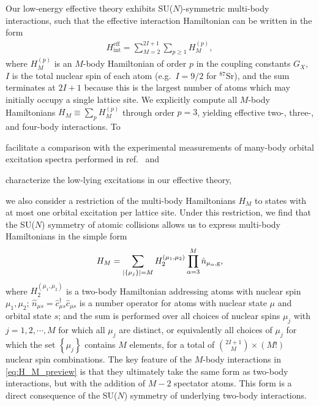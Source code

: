 \documentclass[preprint,showkeys,nofootinbib]{revtex4-1}
\renewcommand{\t}{\text} %
\newcommand{\p}[1]{\left(#1\right)} %
\renewcommand{\set}[1]{\left\{#1\right\}} %
\newcommand{\g}{\text{g}}
\renewcommand{\c}{\hat{c}}
\newcommand{\n}{\hat{n}}
\newcommand{\1}{\mathds{1}}
\begin{document}
Our low-energy effective theory exhibits SU($N$)-symmetric multi-body
interactions, such that the effective interaction Hamiltonian can be
written in the form
\begin{align}
  H_{\t{int}}^{\t{eff}} = \sum_{M=2}^{2I+1} \sum_{p\ge1} H_M^{(p)},
\end{align}
where $H_M^{(p)}$ is an $M$-body Hamiltonian of order $p$ in the
coupling constants $G_X$, $I$ is the total nuclear spin of each atom
(e.g.~$I=9/2$ for ${}^{87}$Sr), and the sum terminates at $2I+1$
because this is the largest number of atoms which may initially occupy
a single lattice site.  We explicitly compute all $M$-body
Hamiltonians $H_M\equiv\sum_p H_M^{(p)}$ through order $p=3$, yielding
effective two-, three-, and four-body interactions.  To
\begin{enumerate*}
\item facilitate a comparison with the experimental measurements of
  many-body orbital excitation spectra performed in
  ref.~\cite{goban2018emergence} and
\item characterize the low-lying excitations in our effective theory,
\end{enumerate*}
we also consider a restriction of the multi-body Hamiltonians $H_M$ to
states with at most one orbital excitation per lattice site.  Under
this restriction, we find that the SU($N$) symmetry of atomic
collisions allows us to express multi-body Hamiltonians in the simple
form
\begin{align}
  H_M = \sum_{\abs{\set{\mu_j}}=M}
  H_2^{(\mu_1,\mu_2)} \prod_{\alpha=3}^M \n_{\mu_\alpha,\g},
  \label{eq:H_M_preview}
\end{align}
where $H_2^{(\mu_1,\mu_2)}$ is a two-body Hamiltonian addressing atoms
with nuclear spin $\mu_1,\mu_2$;
$\n_{\mu s}=\c_{\mu s}^\dag\c_{\mu s}$ is a number operator for atoms
with nuclear state $\mu$ and orbital state $s$; and the sum is
performed over all choices of nuclear spins $\mu_j$ with
$j=1,2,\cdots,M$ for which all $\mu_j$ are distinct, or equivalently
all choices of $\mu_j$ for which the set $\set{\mu_j}$ contains $M$
elements, for a total of ${2I+1\choose M}\times\p{M!}$ nuclear spin
combinations.  The key feature of the $M$-body interactions in
\eqref{eq:H_M_preview} is that they ultimately take the same form as
two-body interactions, but with the addition of $M-2$ spectator atoms.
This form is a direct consequence of the SU($N$) symmetry of
underlying two-body interactions.


\newpage
\end{document}
